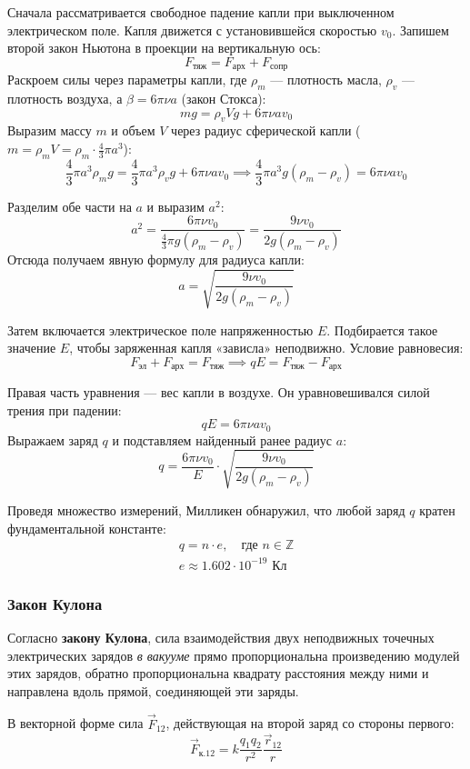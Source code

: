 Сначала рассматривается свободное падение капли при выключенном электрическом поле. Капля движется с установившейся скоростью $v_0$.
Запишем второй закон Ньютона в проекции на вертикальную ось:
\[
F_{\text{тяж}} = F_{\text{арх}} + F_{\text{сопр}}
\]
Раскроем силы через параметры капли, где $\rho_m$ — плотность масла, $\rho_v$ — плотность воздуха, а $\beta = 6\pi\nu a$ (закон Стокса):
\[
mg = \rho_v V g + 6\pi\nu a v_0
\]
Выразим массу $m$ и объем $V$ через радиус сферической капли ($m = \rho_m V = \rho_m \cdot \frac{4}{3}\pi a^3$):
\[
\frac{4}{3}\pi a^3 \rho_m g = \frac{4}{3}\pi a^3 \rho_v g + 6\pi\nu a v_0\implies \frac{4}{3}\pi a^3 g (\rho_m - \rho_v) = 6\pi\nu a v_0
\]

Разделим обе части на $a$ и выразим $a^2$:
\[
a^2 = \frac{6\pi\nu v_0}{\frac{4}{3}\pi g (\rho_m - \rho_v)} = \frac{9 \nu v_0}{2 g (\rho_m - \rho_v)}
\]
Отсюда получаем явную формулу для радиуса капли:
\[
a = \sqrt{\frac{9 \nu v_0}{2 g (\rho_m - \rho_v)}} \label{eq:radius}
\]

Затем включается электрическое поле напряженностью $E$. Подбирается такое значение $E$, чтобы заряженная капля «зависла» неподвижно.
Условие равновесия:
\[
F_{\text{эл}} + F_{\text{арх}} = F_{\text{тяж}}\implies qE = F_{\text{тяж}} - F_{\text{арх}}
\]

Правая часть уравнения --- вес капли в воздухе. Он уравновешивался силой трения при падении:
\[
qE = 6\pi\nu a v_0
\]
Выражаем заряд $q$ и подставляем найденный ранее радиус $a$:
\[
q = \frac{6\pi\nu v_0}{E} \cdot \sqrt{\frac{9 \nu v_0}{2 g (\rho_m - \rho_v)}}
\]

Проведя множество измерений, Милликен обнаружил, что любой заряд $q$ кратен фундаментальной константе:
\[
\boxed{\begin{gathered}
q = n \cdot e, \quad \text{где } n \in \mathbb{Z}\\
e \approx 1.602 \cdot 10^{-19} \text{ Кл}
\end{gathered}}\]

\subsubsection{Закон Кулона}

Согласно \textbf{закону Кулона}, сила взаимодействия двух неподвижных точечных электрических зарядов \textit{в вакууме} прямо пропорциональна произведению модулей этих зарядов, обратно пропорциональна квадрату расстояния между ними и направлена вдоль прямой, соединяющей эти заряды.

В векторной форме сила $\vec{F}_{12}$, действующая на второй заряд со стороны первого:
\[
    \vec{F}_{\text{к.}12} = k \frac{q_1 q_2}{r^2} \frac{\vec{r}_{12}}{r}
\]

